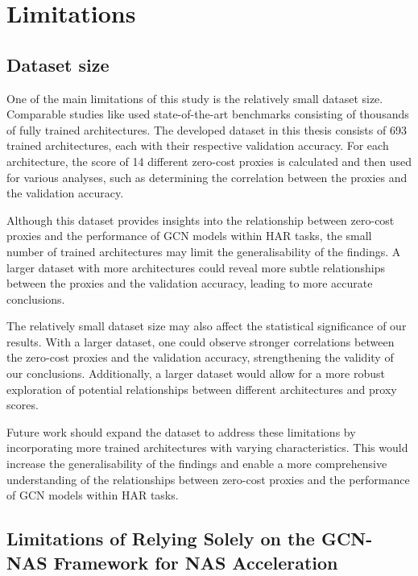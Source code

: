 \section{Limitations}
\subsection{Dataset size}

One of the main limitations of this study is the relatively small dataset size. Comparable studies like \autocite{abdelfattah2021zero, colin2022adeeperlook} used state-of-the-art benchmarks consisting of thousands of fully trained architectures. The developed dataset in this thesis consists of 693 trained architectures, each with their respective validation accuracy. For each architecture, the score of 14 different zero-cost proxies is calculated and then used for various analyses, such as determining the correlation between the proxies and the validation accuracy.

Although this dataset provides insights into the relationship between zero-cost proxies and the performance of \gls{GCN} models within \gls{HAR} tasks, the small number of trained architectures may limit the generalisability of the findings. A larger dataset with more architectures could reveal more subtle relationships between the proxies and the validation accuracy, leading to more accurate conclusions.

The relatively small dataset size may also affect the statistical significance of our results. With a larger dataset, one could observe stronger correlations between the zero-cost proxies and the validation accuracy, strengthening the validity of our conclusions. Additionally, a larger dataset would allow for a more robust exploration of potential relationships between different architectures and proxy scores.

Future work should expand the dataset to address these limitations by incorporating more trained architectures with varying characteristics. This would increase the generalisability of the findings and enable a more comprehensive understanding of the relationships between zero-cost proxies and the performance of \gls{GCN} models within \gls{HAR} tasks.


\subsection{Limitations of Relying Solely on the \gls{GCN}-\gls{NAS} Framework for \gls{NAS} Acceleration}


